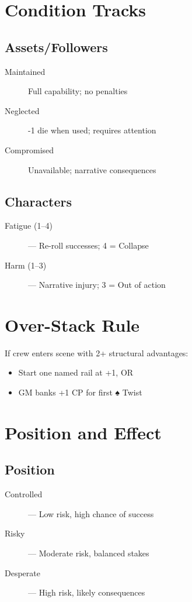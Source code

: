 \section{Condition Tracks}

\subsection*{Assets/Followers}
\begin{description}
  \item[Maintained] Full capability; no penalties
  \item[Neglected] -1 die when used; requires attention
  \item[Compromised] Unavailable; narrative consequences
\end{description}

\subsection*{Characters}
\begin{description}
  \item[Fatigue (1–4)] — Re-roll successes; 4 = Collapse
  \item[Harm (1–3)] — Narrative injury; 3 = Out of action
\end{description}

\section{Over-Stack Rule}

If crew enters scene with 2+ structural advantages:
\begin{itemize}
  \item Start one named rail at +1, OR
  \item GM banks +1 CP for first ♠ Twist
\end{itemize}

\section{Position and Effect}

\subsection*{Position}
\begin{description}
  \item[Controlled] — Low risk, high chance of success
  \item[Risky] — Moderate risk, balanced stakes
  \item[Desperate] — High risk, likely consequences
\end{description}

